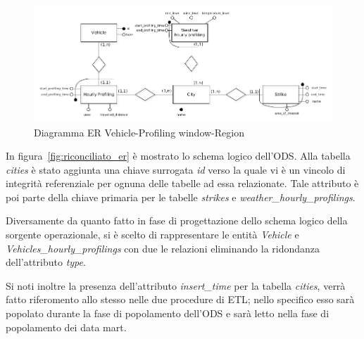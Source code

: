 \begin{figure}[H]                                                                                                                                                            
\centering                                                                                                                                                                   
\includegraphics[width=\textwidth]{diagrams/integrated_1_er}                                                                                                                                   
\caption{Diagramma ER Vehicle-Profiling window-Region}                                                                                                                                            
\label{fig:integrated_1_er}                                                                                                                                                           
\end{figure}

In figura~\ref{fig:riconciliato_er} è mostrato lo schema logico dell'ODS.
Alla tabella \textit{cities} è stato aggiunta una chiave surrogata \textit{id}
verso la quale vi è un vincolo di integrità referenziale per ognuna delle tabelle
ad essa relazionate. Tale attributo è poi parte della chiave primaria per le
tabelle \textit{strikes} e \textit{weather\_hourly\_profilings}.

Diversamente da quanto fatto in fase di progettazione dello schema logico della
sorgente operazionale, si è scelto di rappresentare le entità \textit{Vehicle}
e \textit{Vehicles\_hourly\_profilings} con due le relazioni eliminando la
ridondanza dell'attributo \textit{type}. 

Si noti inoltre la presenza dell'attributo \textit{insert\_time} per la
tabella \textit{cities}, verrà fatto riferomento allo stesso nelle due procedure
di ETL; nello specifico esso sarà popolato durante la fase di popolamento
dell'ODS e sarà letto nella fase di popolamento dei data mart.

